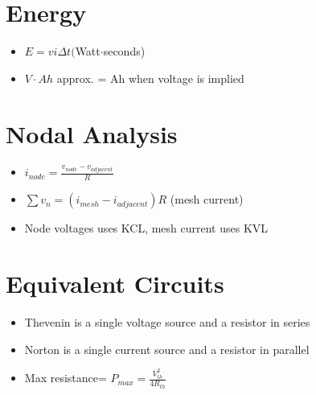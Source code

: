 \documentclass [12pt] {article}
\begin{document}
\begin{multicols*}{2}
\section{Energy}
	\begin{itemize}
		\item $E = vi\Delta t ($Watt$ \cdot $seconds)
		\item $V\cdot Ah$ approx. = Ah when voltage is implied
	\end{itemize}
\section{Nodal Analysis}
	\begin{itemize}
		\item $i_{node} = \frac{v_{node} - v_{adjacent}}{R}$ 
		\item $\sum v_n = (i_{mesh} - i_{adjacent})R $ (mesh current) 
		\item Node voltages uses KCL, mesh current uses KVL 
	\end{itemize}
\section{Equivalent Circuits}
	\begin{itemize}
		\item Thevenin is a single voltage source and a resistor in series 
		\item Norton is a single current source and a resistor in parallel 
		\item Max resistance= $P_{max} = \frac{V_{th}^2}{4R_{th}}$ 
	\end{itemize}

\end{multicols*}
\end{document}
